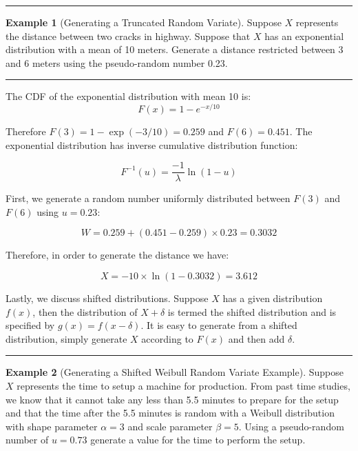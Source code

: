 \documentclass[
]{book}
\theoremstyle{definition}
\theoremstyle{definition}
\newtheorem{example}{Example}[chapter]
\theoremstyle{definition}
\theoremstyle{definition}
\theoremstyle{remark}
\begin{document}
\begin{center}\rule{0.5\linewidth}{0.5pt}\end{center}

\begin{example}[Generating a Truncated Random Variate]
\protect\hypertarget{exm:TruncatedRV}{}{\label{exm:TruncatedRV} {} }Suppose \(X\) represents the distance between two cracks in highway. Suppose that \(X\)
has an exponential distribution with a mean of 10 meters. Generate a
distance restricted between 3 and 6 meters using the pseudo-random
number 0.23.
\end{example}

\begin{center}\rule{0.5\linewidth}{0.5pt}\end{center}

The CDF of the exponential distribution with mean 10 is:
\[
F(x) = 1 - e^{-x/10}
\]

Therefore \(F(3) = 1- \exp(-3/10) = 0.259\) and \(F(6) = 0.451\). The
exponential distribution has inverse cumulative distribution function:

\[
F^{-1}(u) = \frac{-1}{\lambda}\ln \left(1-u \right)
\]

First, we generate a random number uniformly distributed between \(F(3)\)
and \(F(6)\) using \(u = 0.23\):

\[
W = 0.259 + (0.451 - 0.259)\times 0.23 = 0.3032
\]

Therefore, in order to generate the distance we have:

\[
X = -10 \times \ln \left(1 - 0.3032 \right) = 3.612
\]

Lastly, we discuss shifted distributions. Suppose \(X\) has a given
distribution \(f(x)\), then the distribution of \(X + \delta\) is termed the
shifted distribution and is specified by \(g(x)=f(x - \delta)\). It is
easy to generate from a shifted distribution, simply generate \(X\)
according to \(F(x)\) and then add \(\delta\).

\begin{center}\rule{0.5\linewidth}{0.5pt}\end{center}

\begin{example}[Generating a Shifted Weibull Random Variate Example]
\protect\hypertarget{exm:ShiftedRV}{}{\label{exm:ShiftedRV} {} }Suppose \(X\) represents
the time to setup a machine for production. From past time studies, we
know that it cannot take any less than 5.5 minutes to prepare for the
setup and that the time after the 5.5 minutes is random with a Weibull
distribution with shape parameter \(\alpha = 3\) and scale parameter
\(\beta = 5\). Using a pseudo-random number of \(u= 0.73\) generate a value
for the time to perform the setup.
\end{example}
\end{document}
